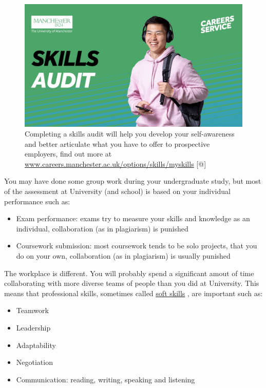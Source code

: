 \documentclass[
]{book}
\providecommand{\tightlist}{%
  \setlength{\itemsep}{0pt}\setlength{\parskip}{0pt}}
\begin{document}
\begin{figure}

{\centering \includegraphics[width=1\linewidth]{images/skills-audit-graphic} 

}

\caption{Completing a skills audit will help you develop your self-awareness and better articulate what you have to offer to prospective employers, find out more at \href{https://www.careers.manchester.ac.uk/options/skills/myskills/}{www.careers.manchester.ac.uk/options/skills/myskills} {[}@{]}}\label{fig:skillsaudit-fig}
\end{figure}



You may have done some group work during your undergraduate study, but most of the assessment at University (and school) is based on your individual performance such as:

\begin{itemize}
\tightlist
\item
  Exam performance: exams try to measure your skills and knowledge as an individual, collaboration (as in plagiarism) is punished
\item
  Coursework submission: most coursework tends to be solo projects, that you do on your own, collaboration (as in plagiarism) is usually punished
\end{itemize}

The workplace is different. You will probably spend a significant amout of time collaborating with more diverse teams of people than you did at University. This means that professional skills, sometimes called \href{https://en.wikipedia.org/wiki/Soft_skills}{soft skills} \citep{soft, transferable, professionalism}, are important such as:

\begin{itemize}
\tightlist
\item
  Teamwork
\item
  Leadership
\item
  Adaptability
\item
  Negotiation
\item
  Communication: reading, writing, speaking and listening
\end{itemize}
\end{document}
